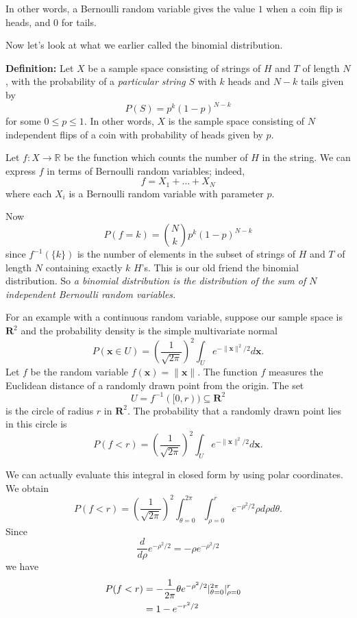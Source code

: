 \documentclass[
  oneside]{scrbook}
\begin{document}
In other words, a Bernoulli random variable gives the value \(1\) when a
coin flip is heads, and \(0\) for tails.

Now let's look at what we earlier called the binomial distribution.

\textbf{Definition:} Let \(X\) be a sample space consisting of strings
of \(H\) and \(T\) of length \(N\), with the probability of a
\emph{particular string} \(S\) with \(k\) heads and \(N-k\) tails given
by \[
P(S)=p^{k}(1-p)^{N-k}
\] for some \(0\le p\le 1\). In other words, \(X\) is the sample space
consisting of \(N\) independent flips of a coin with probability of
heads given by \(p\).

Let \(f:X\to \mathbb{R}\) be the function which counts the number of
\(H\) in the string. We can express \(f\) in terms of Bernoulli random
variables; indeed, \[
f=X_1+\ldots+X_N
\] where each \(X_i\) is a Bernoulli random variable with parameter
\(p\).

Now \[
P(f=k) = \binom{N}{k}p^{k}(1-p)^{N-k}
\] since \(f^{-1}(\{k\})\) is the number of elements in the subset of
strings of \(H\) and \(T\) of length \(N\) containing exactly \(k\)
\(H\)'s. This is our old friend the binomial distribution. So \emph{a
binomial distribution is the distribution of the sum of \(N\)
independent Bernoulli random variables.}

For an example with a continuous random variable, suppose our sample
space is \(\mathbf{R}^{2}\) and the probability density is the simple
multivariate normal \[
P(\mathbf{x}\in U) = \left(\frac{1}{\sqrt{2\pi}}\right)^2\int_{U} e^{-\|\mathbf{x}\|^2/2} d\mathbf{x}.
\] Let \(f\) be the random variable \(f(\mathbf{x})=\|\mathbf{x}\|\).
The function \(f\) measures the Euclidean distance of a randomly drawn
point from the origin. The set
\[U=f^{-1}([0,r))\subseteq\mathbf{R}^{2}\] is the circle of radius \(r\)
in \(\mathbf{R}^{2}\). The probability that a randomly drawn point lies
in this circle is \[
P(f<r) = \left(\frac{1}{\sqrt{2\pi}}\right)^2\int_{U} e^{-\|\mathbf{x}\|^2/2} d\mathbf{x}.
\]

We can actually evaluate this integral in closed form by using polar
coordinates. We obtain \[
P(f<r) = \left(\frac{1}{\sqrt{2\pi}}\right)^2\int_{\theta=0}^{2\pi}\int_{\rho=0}^{r} e^{-\rho^2/2}\rho d\rho d\theta.
\] Since \[
\frac{d}{d\rho}e^{-\rho^2/2}=-\rho e^{-\rho^2/2}
\] we have \begin{align*}
P(f<r)&=-\frac{1}{2\pi}\theta e^{-\rho^2/2}|_{\theta=0}^{2\pi}|_{\rho=0}^{r}\cr
&=1-e^{-r^2/2}\cr
\end{align*}
\end{document}
